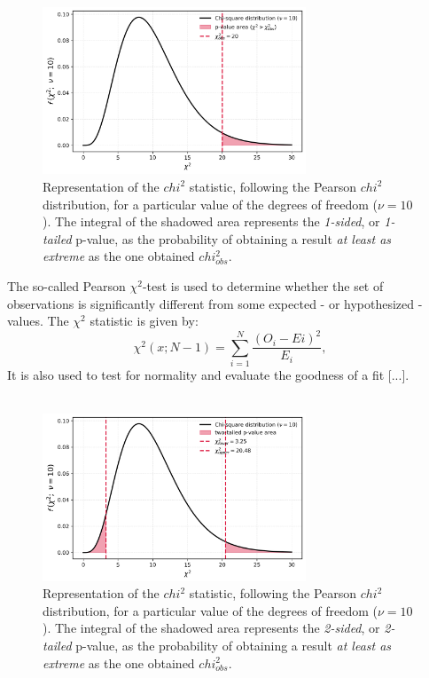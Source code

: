 \documentclass{book}
\begin{document}
\begin{figure}[ht]
    \centering
    \includegraphics[width=0.7\textwidth]{figures/chapter4/chi2_test_one_tailed.png}
    \caption{Representation of the $chi^{2}$ statistic, following the Pearson $chi^{2}$ distribution, for a particular value of the degrees of freedom ($\nu = 10$). The integral of the shadowed area represents the \textit{1-sided}, or \textit{1-tailed} p-value, as the probability of obtaining a result \textit{at least as extreme} as the one obtained $chi^{2}_{obs}$.}
    \label{fig:chi2_test1}
\end{figure}

The so-called Pearson $\chi^{2}$-test is used to determine whether the set of observations is significantly different from some expected - or hypothesized - values. The $\chi^{2}$ statistic is given by:
\[
    \chi^{2}(x; N - 1) = \sum_{i = 1}^{N}\frac{(O_{i} - E{i})^{2}}{E_i},
\]
It is also used to test for normality and evaluate the goodness of a fit [...].\\\

\begin{figure}[ht]
    \centering
    \includegraphics[width=0.7\textwidth]{figures/chapter4/chi2_test_two_tailed.png}
    \caption{Representation of the $chi^{2}$ statistic, following the Pearson $chi^{2}$ distribution, for a particular value of the degrees of freedom ($\nu = 10$). The integral of the shadowed area represents the \textit{2-sided}, or \textit{2-tailed} p-value, as the probability of obtaining a result \textit{at least as extreme} as the one obtained $chi^{2}_{obs}$.}
    \label{fig:chi2_test2}
\end{figure}
\end{document}
